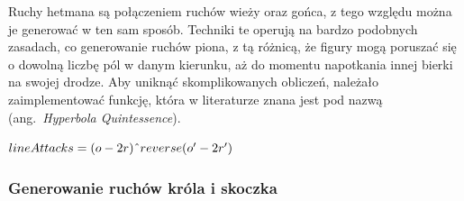 Ruchy hetmana są połączeniem ruchów wieży oraz gońca, z tego względu można je generować w ten sam sposób.
Techniki te operują na bardzo podobnych zasadach, co generowanie ruchów piona, z tą różnicą, że figury mogą poruszać się o dowolną liczbę pól w danym kierunku, aż do momentu napotkania innej bierki na swojej drodze.
Aby uniknąć skomplikowanych obliczeń, należało zaimplementować funkcję, która w literaturze znana jest pod nazwą (ang.~\emph{Hyperbola Quintessence}).

$lineAttacks =   (o-2r) \string^ reverse( o'-2r')$

\subsubsection{Generowanie ruchów króla i skoczka}

